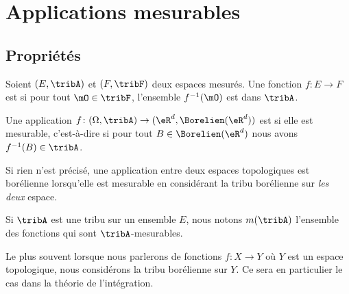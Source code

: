 
\section{Applications mesurables}

\subsection{Propriétés}

\begin{definition} \label{DefQKjDSeC}
    Soient \( (E,\tribA)\) et \( (F,\tribF)\) deux espaces mesurés. Une fonction \( f\colon E\to F\) est  si pour tout \( \mO\in \tribF\), l'ensemble \( f^{-1}(\mO)\) est dans \( \tribA\).
\end{definition}

\begin{definition}     \label{DefHHIBooNrpQjs}
    Une application \( f\colon (\Omega,\tribA)\to (\eR^d,\Borelien(\eR^d))\) est  si elle est mesurable, c'est-à-dire si pour tout \( B\in\Borelien(\eR^d)\) nous avons \( f^{-1}(B)\in\tribA\).

    Si rien n'est précisé, une application entre deux espaces topologiques est borélienne lorsqu'elle est mesurable en considérant la tribu borélienne sur \emph{les deux} espace.
\end{definition}
Si \( \tribA\) est une tribu sur un ensemble \( E\), nous notons \( m(\tribA)\) l'ensemble des fonctions qui sont \( \tribA\)-mesurables.

Le plus souvent lorsque nous parlerons de fonctions \( f\colon X\to Y\) où \( Y\) est un espace topologique, nous considérons la tribu borélienne sur \( Y\). Ce sera en particulier le cas dans la théorie de l'intégration.

